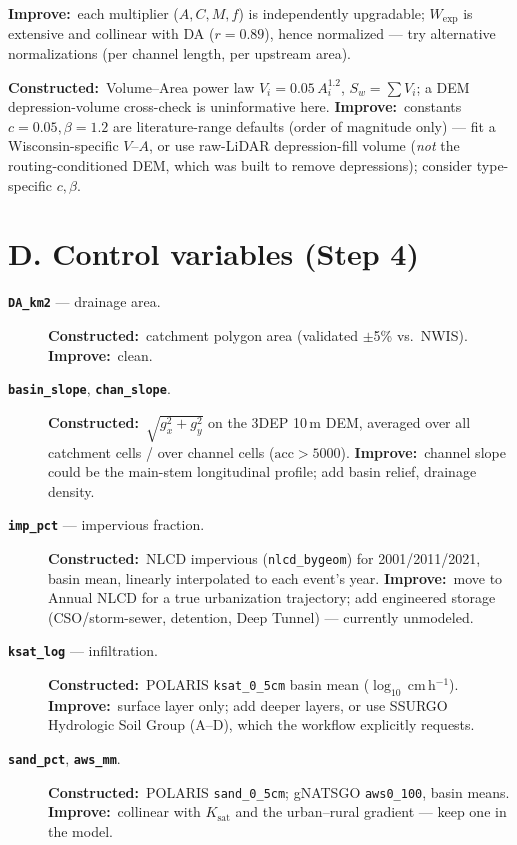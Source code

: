 \documentclass[11pt]{article}
\newcommand{\imp}{\textcolor{impcol}{\textbf{Improve:}}\ }
\newcommand{\con}{\textbf{Constructed:}\ }
\newcommand{\var}[1]{\textbf{\texttt{#1}}}
\begin{document}
\begin{description}
\imp each multiplier ($A,C,M,f$) is independently upgradable; $W_{\exp}$ is extensive and collinear with DA ($r{=}0.89$),
hence normalized --- try alternative normalizations (per channel length, per upstream area).
\item[\var{Sw\_va\_m3} --- storage capacity.] \con Volume--Area power law $V_i=0.05\,A_i^{1.2}$, $S_w=\sum V_i$;
a DEM depression-volume cross-check is uninformative here. \imp constants $c{=}0.05,\beta{=}1.2$ are
literature-range defaults (order of magnitude only) --- fit a Wisconsin-specific $V$--$A$, or use raw-LiDAR
depression-fill volume (\emph{not} the routing-conditioned DEM, which was built to remove depressions);
consider type-specific $c,\beta$.
\end{description}

\section{D. Control variables (Step 4)}
\begin{description}
\item[\var{DA\_km2} --- drainage area.] \con catchment polygon area (validated $\pm$5\% vs.\ NWIS). \imp clean.
\item[\var{basin\_slope}, \var{chan\_slope}.] \con $\sqrt{g_x^2+g_y^2}$ on the 3DEP 10\,m DEM, averaged over all
catchment cells / over channel cells ($\text{acc}>5000$). \imp channel slope could be the main-stem longitudinal
profile; add basin relief, drainage density.
\item[\var{imp\_pct} --- impervious fraction.] \con NLCD impervious (\texttt{nlcd\_bygeom}) for 2001/2011/2021,
basin mean, linearly interpolated to each event's year. \imp move to Annual NLCD for a true urbanization
trajectory; add engineered storage (CSO/storm-sewer, detention, Deep Tunnel) --- currently unmodeled.
\item[\var{ksat\_log} --- infiltration.] \con POLARIS \texttt{ksat\_0\_5cm} basin mean ($\log_{10}$\,cm\,h$^{-1}$).
\imp surface layer only; add deeper layers, or use SSURGO Hydrologic Soil Group (A--D), which the workflow explicitly requests.
\item[\var{sand\_pct}, \var{aws\_mm}.] \con POLARIS \texttt{sand\_0\_5cm}; gNATSGO \texttt{aws0\_100}, basin means.
\imp collinear with $K_{\text{sat}}$ and the urban--rural gradient --- keep one in the model.
\end{description}
\end{document}
